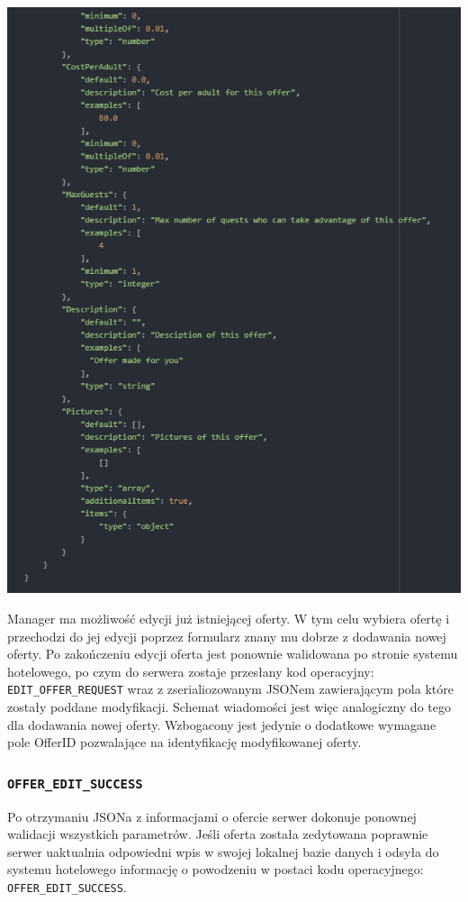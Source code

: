 \documentclass{article}
\begin{document}
\begin{center}
    \includegraphics[width=\linewidth]{Oferta-Hotel-Serwer/Offer_Edit_JSON2.png}
\end{center}

Manager ma możliwość edycji już istniejącej oferty. W tym celu wybiera ofertę i przechodzi do jej edycji poprzez formularz znany mu dobrze z dodawania nowej oferty. Po zakończeniu edycji oferta jest ponownie walidowana po stronie systemu hotelowego, po czym do serwera zostaje przesłany kod operacyjny: \texttt{EDIT\_OFFER\_REQUEST} wraz z zserialiozowanym JSONem zawierającym pola które zostały poddane modyfikacji. Schemat wiadomości jest więc analogiczny do tego dla dodawania nowej oferty. Wzbogacony jest jedynie o dodatkowe wymagane pole OfferID pozwalające na identyfikację modyfikowanej oferty.
\subsubsection{\texttt{OFFER\_EDIT\_SUCCESS}}
Po otrzymaniu JSONa z informacjami o ofercie serwer dokonuje ponownej walidacji wszystkich parametrów. Jeśli oferta została zedytowana poprawnie serwer uaktualnia odpowiedni wpis w swojej lokalnej bazie danych i odsyła do systemu hotelowego informację o powodzeniu w postaci kodu operacyjnego: \texttt{OFFER\_EDIT\_SUCCESS}. 
\end{document}
